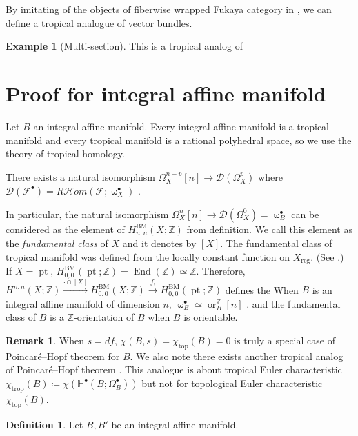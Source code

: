 \documentclass[a4paper,dvipdfmx,reqno,12pt]{amsart}
\theoremstyle{definition}
\newtheorem{Def}[Thm]{Definition}
\newtheorem{Eg}[Thm]{Example}
\newtheorem{Rmk}[Thm]{Remark}
\newcommand{\deq}{\coloneqq}
\newcommand{\Z}{\mathbb{Z}}%
\newcommand{\mb}[1]{\mathbb{#1}}%
\newcommand{\mcal}[1]{\mathcal{#1}}%
\newcommand{\opn}[1]{\operatorname{#1}}
\newcommand{\xto}[1]{\xrightarrow{#1}}
\numberwithin{equation}{section}
\begin{document}
By imitating of the objects of fiberwise wrapped Fukaya category 
in \cite{auroux2022lagrangian}, we can define a tropical 
analogue of vector bundles.
\begin{Eg}[{Multi-section}]

This is a tropical analog of 
\end{Eg}
 
\section{Proof for integral affine manifold}

Let $B$ an integral affine manifold. Every integral affine 
manifold is a tropical manifold and every tropical manifold is 
a rational polyhedral space, so we use the theory of 
tropical homology.

There exists a natural isomorphism $\Omega_X^{n-p}[n]\to 
\mcal{D}(\Omega_{X}^{p})$ where 
$\mcal{D}(\mcal{F}^{\bullet})
=R\mcal{H}om(\mcal{F};\upomega_X^{\bullet})$
\cite[Theorem 6.2]{gross2019sheaftheoretic}.

In particular, the natural isomorphism $\Omega_X^{n}[n]\to 
\mcal{D}(\Omega_{X}^{0})=\upomega_B^{\bullet}$
can be considered as the element of $H_{n,n}^{\opn{BM}}(X;\Z)$ 
from definition. 
We call this element as the \emph{fundamental class} of $X$ 
and it denotes by $[X]$. The fundamental class of tropical
manifold was defined from the locally constant function on 
$X_{\opn{reg}}$. (See \cite[Definition 4.8]{jellLefschetzTheoremTropical2018a}.)
If $X=\opn{pt}$, $H_{0,0}^{\opn{BM}}(\opn{pt};\Z)=\opn{End}(\Z)\simeq \Z$.
Therefore, $H^{n,n}(X;\Z)\xto{\cdot \cap [X]} H_{0,0}^{\opn{BM}}(X;\Z)
\xto{f_!} H_{0,0}^{\opn{BM}}(\opn{pt};\Z)$ defines
the 
When $B$ is an integral affine manifold of dimension $n$, 
$\upomega^{\bullet}_{B}\simeq \opn{or}_{B}^{\Z}[n]$ 
\cite[]{}.
and the fundamental class of $B$ is a $\Z$-orientation of $B$
when $B$ is orientable.

\begin{Rmk}
When $s=df$, $\chi(B,s)=\chi_{\opn{top}}(B)=0$ is 
truly a special case of Poincar\'e--Hopf theorem for $B$.
We also note there exists another tropical analog of Poincar\'e--Hopf theorem
  \cite{rau2020tropical}. This analogue is about tropical Euler characteristic
  $\chi_{\opn{trop}}(B)\deq \chi(\mb{H}^{\bullet}(B;\Omega_B^{\bullet}))$
  but not for topological Euler characteristic $\chi_{\opn{top}}(B)$.
\end{Rmk}

\begin{Def}
Let $B,B'$ be an integral affine manifold.
\end{Def}
\end{document}
